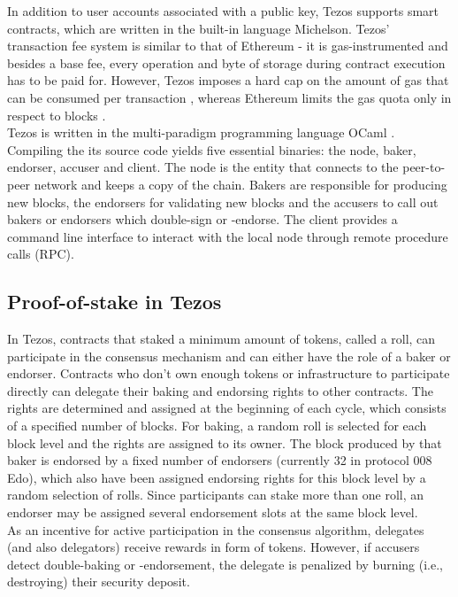 In addition to user accounts associated with a public key, Tezos supports smart contracts, which are written in the built-in language Michelson. Tezos' transaction fee system is similar to that of Ethereum \cite{wood_ethereum_2021} - it is gas-instrumented and besides a base fee, every operation and byte of storage during contract execution has to be paid for. However, Tezos imposes a hard cap on the amount of gas that can be consumed per transaction \cite{goodman_tezos_2014}, whereas Ethereum limits the gas quota only in respect to blocks \cite{wood_ethereum_2021}.\\
Tezos is written in the multi-paradigm programming language OCaml \cite{ocaml_doc}. Compiling the its source code yields five essential binaries: the node, baker, endorser, accuser and client. The node is the entity that connects to the peer-to-peer network and keeps a copy of the chain. Bakers are responsible for producing new blocks, the endorsers for validating new blocks and the accusers to call out bakers or endorsers which double-sign or -endorse. The client provides a command line interface to interact with the local node through remote procedure calls (RPC).

\subsection{Proof-of-stake in Tezos}
In Tezos, contracts that staked a minimum amount of tokens, called a roll, can participate in the consensus mechanism and can either have the role of a baker or endorser. Contracts who don't own enough tokens or infrastructure to participate directly can delegate their baking and endorsing rights to other contracts. The rights are determined and assigned at the beginning of each cycle, which consists of a specified number of blocks. For baking, a random roll is selected for each block level and the rights are assigned to its owner. The block produced by that baker is endorsed by a fixed number of endorsers (currently 32 in protocol 008 Edo), which also have been assigned endorsing rights for this block level by a random selection of rolls. Since participants can stake more than one roll, an endorser may be assigned several endorsement slots at the same block level. \\
As an incentive for active participation in the consensus algorithm, delegates (and also delegators) receive rewards in form of tokens. However, if accusers detect double-baking or -endorsement, the delegate is penalized by burning (i.e., destroying) their security deposit. \cite{tezos_docs}

